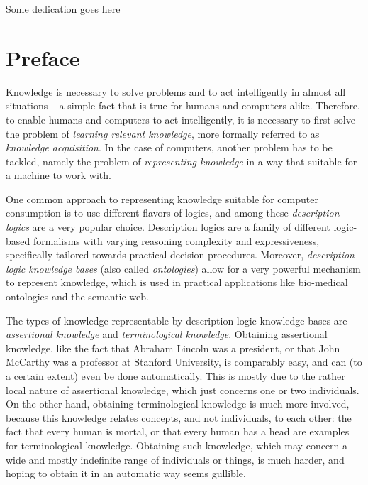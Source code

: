 \vspace*{0.38196601125\textheight}
\begin{center}
  Some dedication goes here
\end{center}

\chapter*{Preface}
\label{cha:preface}

\thispagestyle{empty}

Knowledge is necessary to solve problems and to act intelligently in almost all situations
-- a simple fact that is true for humans and computers alike.  Therefore, to enable humans
and computers to act intelligently, it is necessary to first solve the problem of
\emph{learning relevant knowledge}, more formally referred to as \emph{knowledge
  acquisition}.  In the case of computers, another problem has to be tackled, namely the
problem of \emph{representing knowledge} in a way that suitable for a machine to work
with.

One common approach to representing knowledge suitable for computer consumption is to use
different flavors of logics, and among these \emph{description logics} are a very popular
choice.  Description logics are a family of different logic-based formalisms with varying
reasoning complexity and expressiveness, specifically tailored towards practical decision
procedures.  Moreover, \emph{description logic knowledge bases} (also called
\emph{ontologies}) allow for a very powerful mechanism to represent knowledge, which is
used in practical applications like bio-medical ontologies and the semantic web.

The types of knowledge representable by description logic knowledge bases are
\emph{assertional knowledge} and \emph{terminological knowledge}.  Obtaining assertional
knowledge, like the fact that Abraham Lincoln was a president, or that John McCarthy was a
professor at Stanford University, is comparably easy, and can (to a certain extent) even
be done automatically.  This is mostly due to the rather local nature of assertional
knowledge, which just concerns one or two individuals.  On the other hand, obtaining
terminological knowledge is much more involved, because this knowledge relates concepts,
and not individuals, to each other: the fact that every human is mortal, or that every
human has a head are examples for terminological knowledge.  Obtaining such knowledge,
which may concern a wide and mostly indefinite range of individuals or things, is much
harder, and hoping to obtain it in an automatic way seems gullible.

